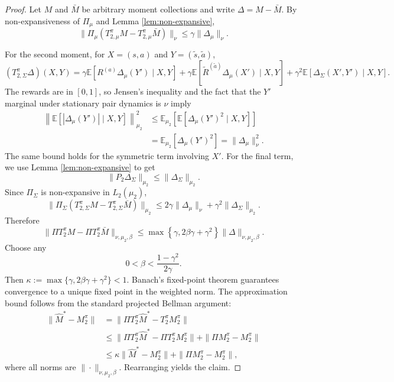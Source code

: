 \documentclass[accepted]{uai2026}
\theoremstyle{plain}
\theoremstyle{definition}
\theoremstyle{remark}
\newcommand{\E}{\mathbb{E}}
\newcommand{\1}{\mathbbm{1}}
\begin{document}
\begin{proof}
Let $M$ and $\bar{M}$ be arbitrary moment collections and write $\Delta = M - \bar{M}$. By non-expansiveness of $\Pi_\mu$ and Lemma \ref{lem:non-expansive},
\begin{equation}
\|\Pi_\mu(T^\pi_{2,\mu}M-T^\pi_{2,\mu}\bar{M})\|_\nu \le \gamma\|\Delta_\mu\|_\nu.
\end{equation}

For the second moment, for $X = (s,a)$ and $Y = (\tilde{s},\tilde{a})$,
\begin{equation}
(T^\pi_{2,\Sigma}\Delta)(X,Y) = \gamma\E[R^{(a)}\Delta_\mu(Y')\mid X,Y] + \gamma\E[\tilde{R}^{(\tilde{a})}\Delta_\mu(X')\mid X,Y] + \gamma^2\E[\Delta_\Sigma(X',Y')\mid X,Y].
\end{equation}
The rewards are in $[0,1]$, so Jensen's inequality and the fact that the $Y'$ marginal under stationary pair dynamics is $\nu$ imply
\begin{equation}
\begin{split}
\left\|\E[| \Delta_\mu(Y') |\mid X,Y]\right\|_{\mu_2}^2 &\le \E_{\mu_2}\left[\E[\Delta_\mu(Y')^2\mid X,Y]\right] \\
&= \E_{\mu_2}[\Delta_\mu(Y')^2] = \|\Delta_\mu\|_\nu^2.
\end{split}
\end{equation}
The same bound holds for the symmetric term involving $X'$. For the final term, we use Lemma \ref{lem:non-expansive} to get
\begin{equation}
\|P_2\Delta_\Sigma\|_{\mu_2}\le \|\Delta_\Sigma\|_{\mu_2}.
\end{equation}
Since $\Pi_\Sigma$ is non-expansive in $L_2(\mu_2)$,
\begin{equation}
\|\Pi_\Sigma(T^\pi_{2,\Sigma}M - T^\pi_{2,\Sigma}\bar{M})\|_{\mu_2} \le 2\gamma\|\Delta_\mu\|_\nu+\gamma^2\|\Delta_\Sigma\|_{\mu_2}.
\end{equation}
Therefore
\begin{equation}
\|\Pi T^\pi_2M-\Pi T^\pi_2\bar{M}\|_{\nu,\mu_2,\beta} \le \max\left\{\gamma, 2\beta\gamma + \gamma^2 \right\}\|\Delta\|_{\nu,\mu_2,\beta}.
\end{equation}
Choose any
\begin{equation}
0 < \beta < \frac{1-\gamma^2}{2\gamma}.
\end{equation}
Then $\kappa := \max\{\gamma,2\beta\gamma + \gamma^2\} < 1$. Banach's fixed-point theorem guarantees convergence to a unique fixed point in the weighted norm. The approximation bound follows from the standard projected Bellman argument:
\begin{equation}
\begin{split}
\|\hat{M}^\ast - M^\pi_2\| &= \|\Pi T^\pi_2\hat{M}^\ast - T^\pi_2M^\pi_2\| \\
&\le \|\Pi T^\pi_2\hat{M}^\ast - \Pi T^\pi_2M^\pi_2\| + \|\Pi M^\pi_2-M^\pi_2\| \\
&\le \kappa\|\hat{M}^\ast - M^\pi_2\| + \|\Pi M^\pi_2 - M^\pi_2\|,
\end{split}
\end{equation}
where all norms are $\|\cdot\|_{\nu,\mu_2,\beta}$. Rearranging yields the claim.
\end{proof}
\end{document}
